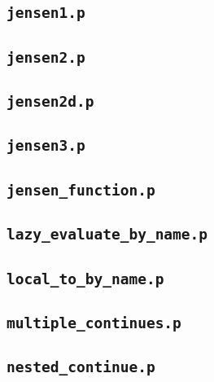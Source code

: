 \subsection{\textbf{\texttt{jensen1.p}}}


\subsection{\textbf{\texttt{jensen2.p}}}


\subsection{\textbf{\texttt{jensen2d.p}}}


\subsection{\textbf{\texttt{jensen3.p}}}


\subsection{\textbf{\texttt{jensen\_function.p}}}


\subsection{\textbf{\texttt{lazy\_evaluate\_by\_name.p}}}


\subsection{\textbf{\texttt{local\_to\_by\_name.p}}}


\subsection{\textbf{\texttt{multiple\_continues.p}}}


\subsection{\textbf{\texttt{nested\_continue.p}}}


